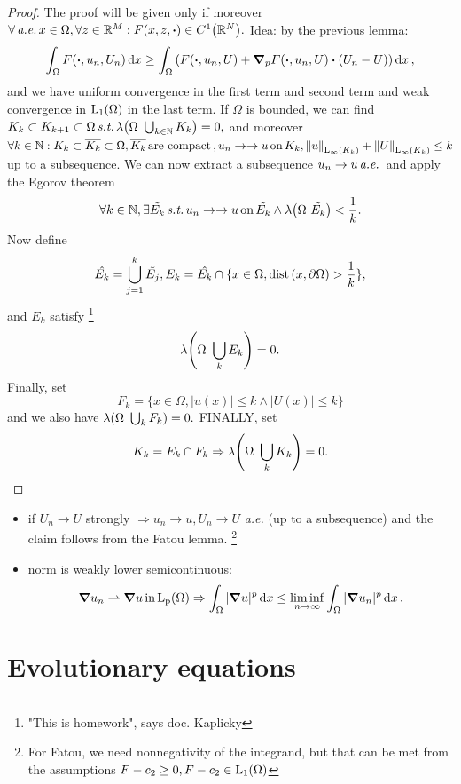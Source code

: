 \documentclass{article}
\begin{document}
\begin{proof}
	The proof will be given only if moreover $\forall \, \text{\textit{a.e.}} \,x \in \Omega, \forall z \in \R^{M}: F\qty(x,z,\vdot) \in C^1\qty(\R^N).$ Idea: by the previous lemma:
	\[
		\int_{\Omega}F\qty(\vdot, u_n, U_n)\dd{x} \geq \int_{\Omega}\qty(F\qty(\vdot, u_n, U) + \grad_p F\qty(\vdot, u_n, U)\vdot\qty(U_n - U))\dd{x},
	\]
	and we have uniform convergence in the first term and second term and weak convergence in $\LpSet[1]{\Omega}$ in the last term. If $\Omega$ is bounded, we can find $K_k \subset K_{k+1} \subset \Omega \, \text{\textit{s.t.}} \, \lambda\qty(\Omega \ \bigcup_{k \in \N}K_k) = 0,$ and moreover $ \forall k \in {\mathbb N}: K_k \subset \overline{K_k} \subset \Omega, \overline{K_k} \, \text{are compact} \,, u_n \to \to u \, \text{on} \,K_k, \norm{u}_{\text{L}_{\infty}\!\,\left(K_k \right)}+\norm{U}_{\text{L}_{\infty}\!\,\left(K_k \right)}\leq k$ up to a subsequence. We can now extract a subsequence $u_n \to u \, \text{\textit{a.e.}} \,$ and apply the Egorov theorem
	\[
		\forall k \in {\mathbb N}, \exists \tilde{E_k} \, \text{\textit{s.t.}} \, u_n \to \to u \, \text{on} \, \tilde{E_k}\wedge \lambda\qty(\Omega \ \tilde{E_k})< \frac{1}{k}.
	\]
	Now define
	\[
		\hat{E_k} = \bigcup_{j=1}^k \tilde{E_j}, E_k = \hat{E_k} \cap \{ x \in \Omega, \operatorname{dist}\qty(x,\partial \Omega) > \frac{1}{k}\},
	\]
	and $E_k$ satisfy \footnote{"This is homework", says doc. Kaplicky}
	\[
		\lambda\qty(\Omega \ \bigcup_{k}E_k) = 0.
	\]
	Finally, set
	\[
		F_k = \{x \in \Omega, |u(x)| \leq k \wedge |U(x)| \leq k\}
	\]
	and we also have $\lambda\qty(\Omega \ \bigcup_{k}F_k) = 0.$ FINALLY, set
	\[
		K_k = E_k \cap F_k \Rightarrow \lambda\qty(\Omega \ \bigcup_{k}K_k)=0.
	\]
\end{proof}
\begin{remark}
	\begin{itemize}
		\item if $U_n \to U$ strongly $\Rightarrow u_n \to u, U_n \to U$ \textit{a.e.} (up to a subsequence) and the claim follows from the Fatou lemma. \footnote{For Fatou, we need nonnegativity of the integrand, but that can be met from the assumptions $F-c_2 \geq 0, F-c_2 \in \LpSet[1]{\Omega}$}
		\item norm is weakly lower semicontinuous:
			\[
				\grad u_n \rightharpoonup \grad u \, \text{in} \, \LpSet{\Omega} \Rightarrow \int_{\Omega}|\grad u|^p\dd{x} \leq \liminf_{n \to \infty} \int_{\Omega}|\grad u_n|^p\dd{x}.
			\]
	\end{itemize}
\end{remark}

\section{Evolutionary equations}
\label{sec:evolutionray_eqs}
\end{document}
